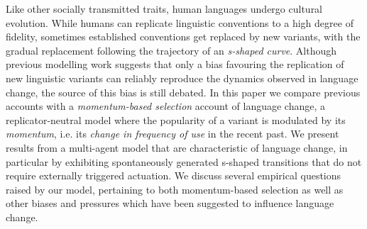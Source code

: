 Like other socially transmitted traits, human languages undergo cultural evolution. While humans can replicate linguistic conventions to a high degree of fidelity, sometimes established conventions get replaced by new variants, with the gradual replacement following the trajectory of an \emph{s-shaped curve}. Although previous modelling work suggests that only a bias favouring the replication of new linguistic variants can reliably reproduce the dynamics observed in language change, the source of this bias is still debated. In this paper we compare previous accounts with a \emph{momentum-based selection} account of language change, a replicator-neutral model where the popularity of a variant is modulated by its \emph{momentum}, i.e. its \emph{change in frequency of use} in the recent past. We present results from a multi-agent model that are characteristic of language change, in particular by exhibiting spontaneously generated s-shaped transitions that do not require externally triggered actuation. We discuss several empirical questions raised by our model, pertaining to both momentum-based selection as well as other biases and pressures which have been suggested to influence language change.
